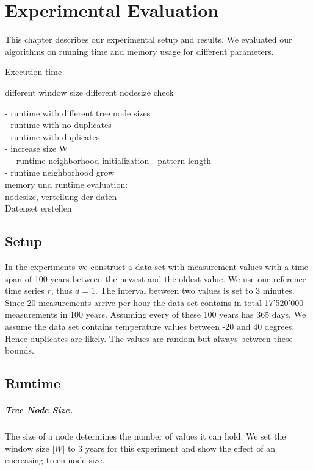 \documentclass[abstracton,12pt]{scrreprt}
\begin{document}
\chapter{Experimental Evaluation}
\label{sec:Experimental}
This chapter describes our experimental setup and results. We evaluated our algorithms on
running time and memory usage for different parameters.

Execution time

different window size
different nodesize check


- runtime with different tree node sizes \\
- runtime with no duplicates\\
- runtime with duplicates\\
- increase size W\\
- 
- runtime neighborhood initialization - pattern length\\
- runtime neighborhood grow\\

memory und runtime evaluation:\\ 
nodesize, verteilung der daten \\
Datenset erstellen \\


\section{Setup}
In the experiments we construct a data set with measurement values with a time span of 100 years between the newest and the oldest value. We use one reference time series $r$, thus $d=1$. The interval between two values is set to $3$ minutes. Since 20 measurements arrive per hour the data set contains in total 17'520'000 measurements in 100 years. Assuming every of these 100 years has 365 days. We assume the data set contains temperature values between -20 and 40 degrees. Hence duplicates are likely. The values are random but always between these bounds. 

\section{Runtime}


\paragraph{Tree Node Size.}
The size of a node determines the number of values it can hold. We set the window size $|W|$ to 3 years for this experiment and show the effect of an encreasing treen node size. 
\end{document}
